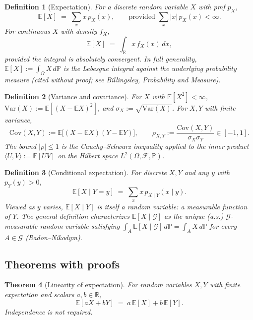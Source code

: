 \documentclass[11pt]{article}
\newtheorem{theorem}{Theorem}[section]
\newtheorem{definition}[theorem]{Definition}
\theoremstyle{remark}
\begin{document}
\begin{definition}[Expectation]
For a discrete random variable $X$ with pmf $p_X$,
\[
\mathbb{E}[X] \;=\; \sum_x x\,p_X(x), \qquad \text{provided } \sum_x |x|\,p_X(x) < \infty.
\]
For continuous $X$ with density $f_X$,
\[
\mathbb{E}[X] \;=\; \int_{\mathbb{R}} x\,f_X(x)\,dx,
\]
provided the integral is absolutely convergent. In full generality, $\mathbb{E}[X] := \int_\Omega X\,d\mathbb{P}$ is the Lebesgue integral against the underlying probability measure (cited without proof; see Billingsley, \emph{Probability and Measure}).
\end{definition}

\begin{definition}[Variance and covariance]
For $X$ with $\mathbb{E}[X^2] < \infty$, $\mathrm{Var}(X) := \mathbb{E}[(X - \mathbb{E}X)^2]$, and $\sigma_X := \sqrt{\mathrm{Var}(X)}$. For $X,Y$ with finite variance,
\[
\mathrm{Cov}(X,Y) := \mathbb{E}\big[(X-\mathbb{E}X)(Y-\mathbb{E}Y)\big], \qquad
\rho_{X,Y} := \frac{\mathrm{Cov}(X,Y)}{\sigma_X\sigma_Y} \in [-1,1].
\]
The bound $|\rho|\le 1$ is the Cauchy--Schwarz inequality applied to the inner product $\langle U,V\rangle := \mathbb{E}[UV]$ on the Hilbert space $L^2(\Omega,\mathcal{F},\mathbb{P})$.
\end{definition}

\begin{definition}[Conditional expectation]
For discrete $X,Y$ and any $y$ with $p_Y(y) > 0$,
\[
\mathbb{E}[X\mid Y = y] \;=\; \sum_x x\,p_{X\mid Y}(x\mid y).
\]
Viewed as $y$ varies, $\mathbb{E}[X\mid Y]$ is itself a random variable: a measurable function of $Y$. The general definition characterizes $\mathbb{E}[X\mid \mathcal{G}]$ as the unique (a.s.) $\mathcal{G}$-measurable random variable satisfying $\int_A \mathbb{E}[X\mid\mathcal{G}]\,d\mathbb{P} = \int_A X\,d\mathbb{P}$ for every $A\in\mathcal{G}$ (Radon--Nikodym).
\end{definition}

\subsection*{Theorems with proofs}

\begin{theorem}[Linearity of expectation]
For random variables $X, Y$ with finite expectation and scalars $a, b\in\mathbb{R}$,
\[
\mathbb{E}[aX + bY] \;=\; a\,\mathbb{E}[X] + b\,\mathbb{E}[Y].
\]
Independence is \emph{not} required.
\end{theorem}
\end{document}
